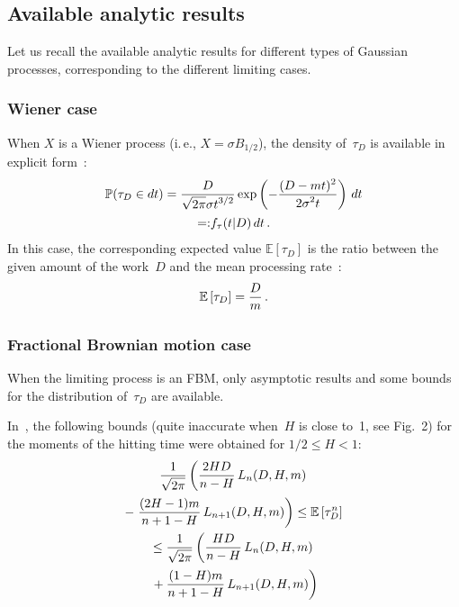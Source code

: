 \begin{multicols}{2}
\subsection{Available analytic results}

\noindent
Let us recall the available analytic results for different types 
of Gaussian processes, corresponding to the different limiting cases. 

\vspace*{-4pt}

\subsubsection{Wiener case}

\noindent
When $X$ is a Wiener process (i.\,e., $X = \sigma B_{1/2}$), 
the  density of~$\tau_D$ is available in  explicit form~\cite{16-luk-1}:
\begin{multline}
\mathbb{P}(\tau_D \in dt)= \displaystyle\frac{\displaystyle D\mathstrut}{\displaystyle \sqrt{2\pi}\sigma t^{3/2}\mathstrut} 
\exp \left( -\displaystyle\frac{\displaystyle (D-mt)^2\mathstrut}{\displaystyle 2\sigma^2 t\mathstrut} \right)\,dt\\
{=:} f_\tau(t|D)\,dt\,.
\label{8}
\end{multline}
In this case, the corresponding expected value $\mathbb{E} [\tau_D ]$ 
is  the ratio between the given  amount of the work~$D$ and the mean processing 
rate~\cite{16-luk-1}:
$$
\mathbb{E} \left[\tau_D\right] = \displaystyle\frac{\displaystyle D\mathstrut}{\displaystyle m\mathstrut}\,.
$$

\vspace*{-12pt}


\subsubsection{Fractional Brownian motion case}



\noindent
When the limiting process is an FBM,  only asymptotic results and some bounds
 for the  distribution of~$\tau_D$ are available.

In~\cite{17-luk-1}, the following bounds (quite inaccurate when~$H$ is close to~1, 
see Fig.~2)
 for the moments of the hitting time were obtained for $1/2 \le H < 1$:
\begin{multline*}
\displaystyle\frac{\displaystyle 1\mathstrut}{\displaystyle \sqrt{2\pi}\mathstrut} \left( \displaystyle\frac{\displaystyle 2 H D\mathstrut}{\displaystyle n-H\mathstrut}\, L_n (D,H,m)\right.\\ - 
\left.\displaystyle\frac{\displaystyle (2H-1)m\mathstrut}{\displaystyle n+1-H\mathstrut} \,L_{n+1}(D,H,m) \right) \le \mathbb{E} \left[\tau_D^n\right]\\
   \le \displaystyle\frac{\displaystyle 1\mathstrut}{\displaystyle \sqrt{2\pi}\mathstrut} \left( \displaystyle\frac{\displaystyle  H D\mathstrut}{\displaystyle n-H\mathstrut} \,L_n (D,H,m)\right.\\
   \left.{} + 
   \displaystyle\frac{\displaystyle (1-H)m\mathstrut}{\displaystyle n+1-H\mathstrut}\, L_{n+1}(D,H,m) \right)
\end{multline*}


\end{multicols}
